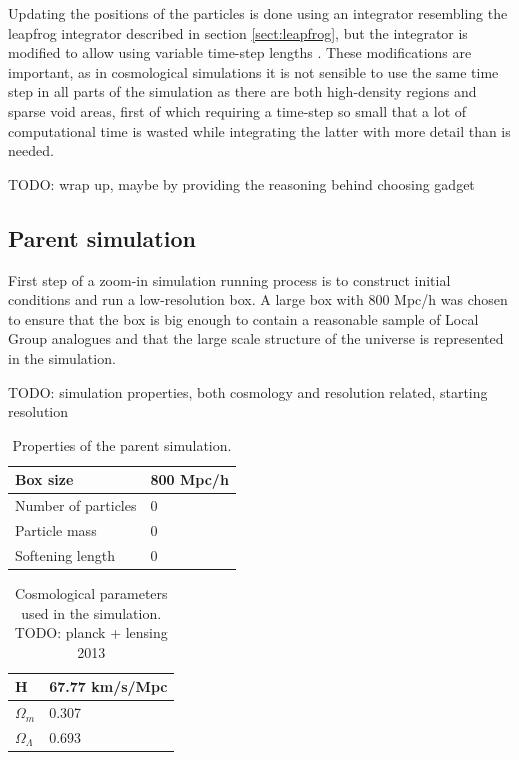 \documentclass[english, oneside]{HYgradu}
\begin{document}
Updating the positions of the particles is done using an integrator resembling the leapfrog integrator described in section \ref{sect:leapfrog}, but the integrator is modified to allow using variable time-step lengths \citep{springel2005cosmological}. These modifications are important, as in cosmological simulations it is not sensible to use the same time step in all parts of the simulation as there are both high-density regions and sparse void areas, first of which requiring a time-step so small that a lot of computational time is wasted while integrating the latter with more detail than is needed.

TODO: wrap up, maybe by providing the reasoning behind choosing gadget %

\subsection{Parent simulation}
First step of a zoom-in simulation running process is to construct initial conditions and run a low-resolution box. A large box with 800 Mpc/h was chosen to ensure that the box is big enough to contain a reasonable sample of Local Group analogues and that the large scale structure of the universe is represented in the simulation.

TODO: simulation properties, both cosmology and resolution related, starting resolution

\begin{table}
	\centering
	\begin{tabular}{| l | l |}
		\hline
		Box size & 800 Mpc/h \\ \hline
		Number of particles & 0 \\ \hline
		Particle mass & 0 \\ \hline
		Softening length & 0 \\ \hline
	\end{tabular}
	\caption{Properties of the parent simulation.} \label{tab:parentBox}
\end{table}

\begin{table}
	\centering
	\begin{tabular}{| l | l |}
		\hline
		H & 67.77 km/s/Mpc\\ \hline
		$\Omega_m$ & 0.307 \\ \hline
		$\Omega_\Lambda$ & 0.693 \\ \hline
	\end{tabular}
	\caption{Cosmological parameters used in the simulation. TODO: planck + lensing 2013} \label{tab:cosmopars}
\end{table}
\end{document}
